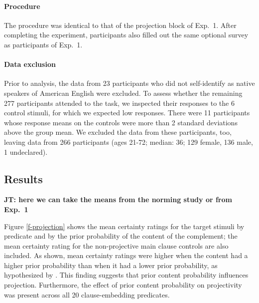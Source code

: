 \documentclass[11pt,fleqn]{article}
\newcommand{\6}{\mbox{$[\hspace*{-.6mm}[$}}
\newcommand{\9}{\mbox{$]\hspace*{-.6mm}]$}}
\newcommand{\jt}[1]{\textbf{\color{blue}JT: #1}}
\begin{document}
\paragraph{Procedure} The procedure was identical to that of the projection block of Exp.~1. After completing the experiment, participants also filled out the same optional survey as participants of Exp.~1.

\paragraph{Data exclusion}
Prior to analysis, the data from 23 participants who did not self-identify as native speakers of American English were excluded. To assess whether the remaining 277 participants attended to the task, we inspected their responses to the 6 control stimuli, for which we expected low responses. There were 11 participants whose response means on the controls were more than 2 standard deviations above the group mean. We excluded the data from these participants, too, leaving data from 266 participants (ages 21-72; median: 36; 129 female, 136 male, 1 undeclared).

\subsection{Results}

\jt{here we can take the means from the norming study or from Exp.~1}

Figure \ref{f-projection} shows the mean certainty ratings for the target stimuli by predicate and by the prior probability of the content of the complement; the mean certainty rating for the non-projective main clause controls are also included. As shown, mean certainty ratings were higher when the content had a higher prior probability than when it had a lower prior probability, as hypothesized by \citet{tbd-variability}. This finding suggests that prior content probability influences projection. Furthermore, the effect of prior content probability on projectivity was present across all 20 clause-embedding predicates.
\end{document}
